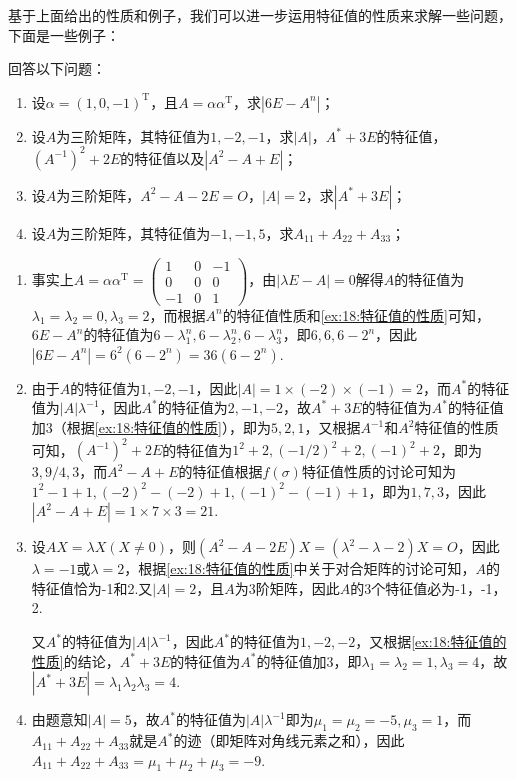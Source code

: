 基于上面给出的性质和例子，我们可以进一步运用特征值的性质来求解一些问题，下面是一些例子：
\begin{example}
    回答以下问题：
    \begin{enumerate}
        \item 设$\alpha=(1,0,-1)^\mathrm{T}$，且$A=\alpha\alpha^\mathrm{T}$，求$|6E-A^n|$；

        \item 设$A$为三阶矩阵，其特征值为$1,-2,-1$，求$|A|$，$A^*+3E$的特征值，$(A^{-1})^2+2E$的特征值以及$|A^2-A+E|$；

        \item 设$A$为三阶矩阵，$A^2-A-2E=O$，$|A|=2$，求$|A^*+3E|$；

        \item 设$A$为三阶矩阵，其特征值为$-1,-1,5$，求$A_{11}+A_{22}+A_{33}$；
    \end{enumerate}
\end{example}

\begin{solution}
    \begin{enumerate}
        \item 事实上$A=\alpha\alpha^\mathrm{T}=\begin{pmatrix}
            1 & 0 & -1 \\ 0 & 0 & 0 \\ -1 & 0 & 1
        \end{pmatrix}$，由$|\lambda E-A|=0$解得$A$的特征值为$\lambda_1=\lambda_2=0,\lambda_3=2$，而根据$A^n$的特征值性质和\autoref{ex:18:特征值的性质}可知，$6E-A^n$的特征值为$6-\lambda_1^n,6-\lambda_2^n,6-\lambda_3^n$，即$6,6,6-2^n$，因此$|6E-A^n|=6^2(6-2^n)=36(6-2^n)$.

        \item 由于$A$的特征值为$1,-2,-1$，因此$|A|=1\times(-2)\times(-1)=2$，而$A^*$的特征值为$|A|\lambda^{-1}$，因此$A^*$的特征值为$2,-1,-2$，故$A^*+3E$的特征值为$A^*$的特征值加3（根据\autoref{ex:18:特征值的性质}），即为$5,2,1$，又根据$A^{-1}$和$A^2$特征值的性质可知，$(A^{-1})^2+2E$的特征值为$1^2+2,(-1/2)^2+2,(-1)^2+2$，即为$3,9/4,3$，而$A^2-A+E$的特征值根据$f(\sigma)$特征值性质的讨论可知为$1^2-1+1,(-2)^2-(-2)+1,(-1)^2-(-1)+1$，即为$1,7,3$，因此$|A^2-A+E|=1\times 7\times 3=21$.

        \item 设$AX=\lambda X(X\neq 0)$，则$(A^2-A-2E)X=(\lambda^2-\lambda-2)X=O$，因此$\lambda=-1$或$\lambda=2$，根据\autoref{ex:18:特征值的性质}中关于对合矩阵的讨论可知，$A$的特征值恰为-1和2.又$|A|=2$，且$A$为3阶矩阵，因此$A$的3个特征值必为-1，-1，2.

        又$A^*$的特征值为$|A|\lambda^{-1}$，因此$A^*$的特征值为$1,-2,-2$，又根据\autoref{ex:18:特征值的性质}的结论，$A^*+3E$的特征值为$A^*$的特征值加3，即$\lambda_1=\lambda_2=1,\lambda_3=4$，故$|A^*+3E|=\lambda_1\lambda_2\lambda_3=4$.

        \item 由题意知$|A|=5$，故$A^*$的特征值为$|A|\lambda^{-1}$即为$\mu_1=\mu_2=-5,\mu_3=1$，而$A_{11}+A_{22}+A_{33}$就是$A^*$的迹（即矩阵对角线元素之和），因此$A_{11}+A_{22}+A_{33}=\mu_1+\mu_2+\mu_3=-9$.
    \end{enumerate}
\end{solution}

